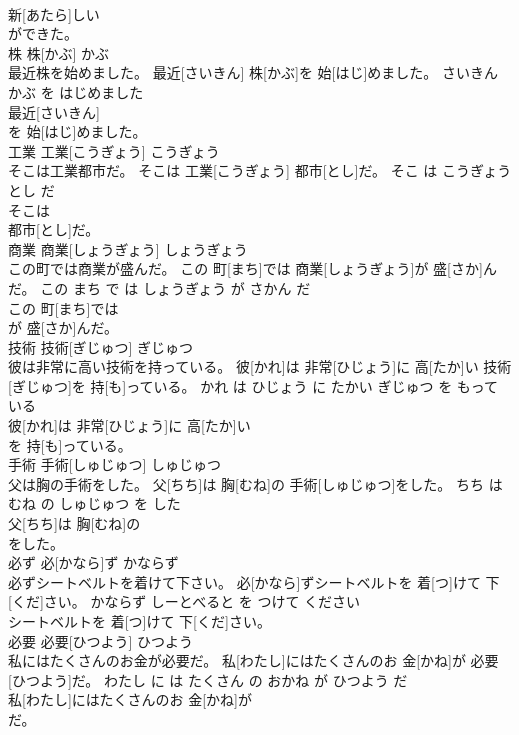 \documentclass[8pt]{extreport}
\begin{document}
\begin{CJK}{UTF8}{min}
\\	新[あたら]しい
\\	ができた。			
\\	株	株[かぶ]	かぶ	
\\	最近株を始めました。	最近[さいきん] 株[かぶ]を 始[はじ]めました。	さいきん かぶ を はじめました	
\\	最近[さいきん]
\\	を 始[はじ]めました。			
\\	工業	工業[こうぎょう]	こうぎょう	
\\	そこは工業都市だ。	そこは 工業[こうぎょう] 都市[とし]だ。	そこ は こうぎょう とし だ	
\\	そこは
\\	都市[とし]だ。			
\\	商業	商業[しょうぎょう]	しょうぎょう	
\\	この町では商業が盛んだ。	この 町[まち]では 商業[しょうぎょう]が 盛[さか]んだ。	この まち で は しょうぎょう が さかん だ	
\\	この 町[まち]では
\\	が 盛[さか]んだ。			
\\	技術	技術[ぎじゅつ]	ぎじゅつ	
\\	彼は非常に高い技術を持っている。	彼[かれ]は 非常[ひじょう]に 高[たか]い 技術[ぎじゅつ]を 持[も]っている。	かれ は ひじょう に たかい ぎじゅつ を もって いる	
\\	彼[かれ]は 非常[ひじょう]に 高[たか]い
\\	を 持[も]っている。			
\\	手術	手術[しゅじゅつ]	しゅじゅつ	
\\	父は胸の手術をした。	父[ちち]は 胸[むね]の 手術[しゅじゅつ]をした。	ちち は むね の しゅじゅつ を した	
\\	父[ちち]は 胸[むね]の
\\	をした。			
\\	必ず	必[かなら]ず	かならず	
\\	必ずシートベルトを着けて下さい。	必[かなら]ずシートベルトを 着[つ]けて 下[くだ]さい。	かならず しーとべると を つけて ください	
\\	シートベルトを 着[つ]けて 下[くだ]さい。			
\\	必要	必要[ひつよう]	ひつよう	
\\	私にはたくさんのお金が必要だ。	私[わたし]にはたくさんのお 金[かね]が 必要[ひつよう]だ。	わたし に は たくさん の おかね が ひつよう だ	
\\	私[わたし]にはたくさんのお 金[かね]が
\\	だ。			

\end{CJK}
\end{document}
